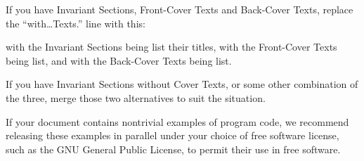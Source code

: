 If you have Invariant Sections, Front-Cover Texts and
Back-Cover Texts, replace the “with…Texts.” line
with this:


\begin{myindentpara}{2cm}
with the Invariant Sections being list their titles, with
the Front-Cover Texts being list, and with the Back-Cover Texts
being list.
\end{myindentpara}

If you have Invariant Sections without Cover Texts, or some
other combination of the three, merge those two alternatives
to suit the situation.

If your document contains nontrivial examples of program code,
we recommend releasing these examples in parallel under your
choice of free software license, such as the GNU General
Public License, to permit their use in free software.

